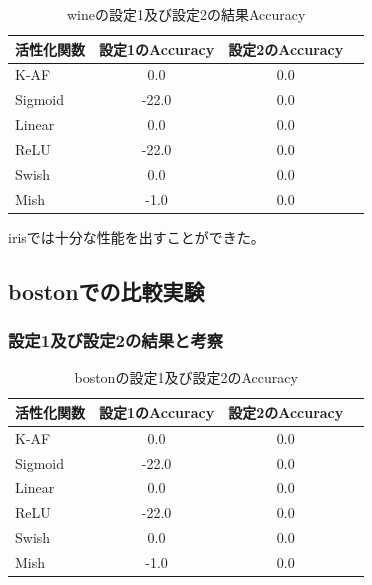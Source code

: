 \begin{table}[htbp]
    \begin{center}
        \caption{wineの設定1及び設定2の結果Accuracy}
        \vspace{2mm} 
        \begin{tabular}{l*{2}{c}r}
            活性化関数              & 設定1のAccuracy &  設定2のAccuracy \\
            \hline
            K-AF            & 0.0 & 0.0 \\
            Sigmoid            & -22.0 & 0.0\\
            Linear            & 0.0 & 0.0\\
            ReLU        & -22.0 & 0.0\\
            Swish           & 0.0 & 0.0 \\
            Mish           & -1.0 & 0.0\\
    
        \end{tabular}
    \end{center}
\end{table}



irisでは十分な性能を出すことができた。


\subsection{bostonでの比較実験}
\label{ev:bostonでの比較実験}

\subsubsection{設定1及び設定2の結果と考察}


\begin{table}[htbp]
    \begin{center}
        \caption{bostonの設定1及び設定2のAccuracy}
        \vspace{2mm} 
        \begin{tabular}{l*{2}{c}r}
            活性化関数              & 設定1のAccuracy &  設定2のAccuracy \\
            \hline
            K-AF            & 0.0 & 0.0 \\
            Sigmoid            & -22.0 & 0.0\\
            Linear            & 0.0 & 0.0\\
            ReLU        & -22.0 & 0.0\\
            Swish           & 0.0 & 0.0 \\
            Mish           & -1.0 & 0.0\\
    
        \end{tabular}
    \end{center}
\end{table}



